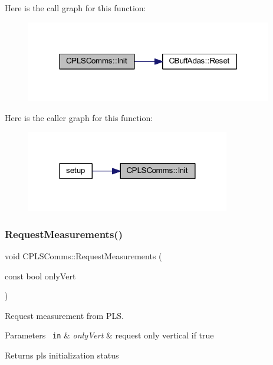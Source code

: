 Here is the call graph for this function\+:
\nopagebreak
\begin{figure}[H]
\begin{center}
\leavevmode
\includegraphics[width=305pt]{class_c_p_l_s_comms_ae7f8d87ea15de35a120d65a7a8bbbb76_cgraph}
\end{center}
\end{figure}
Here is the caller graph for this function\+:
\nopagebreak
\begin{figure}[H]
\begin{center}
\leavevmode
\includegraphics[width=252pt]{class_c_p_l_s_comms_ae7f8d87ea15de35a120d65a7a8bbbb76_icgraph}
\end{center}
\end{figure}
\mbox{\label{class_c_p_l_s_comms_ab69a49f5c4cd7b4b9f63fa16c7792920}} 
\subsubsection{\texorpdfstring{RequestMeasurements()}{RequestMeasurements()}}
{\footnotesize\ttfamily void C\+P\+L\+S\+Comms\+::\+Request\+Measurements (\begin{DoxyParamCaption}\item[{const bool}]{only\+Vert }\end{DoxyParamCaption})}



Request measurement from P\+LS. 


\begin{DoxyParams}[1]{Parameters}
\mbox{\texttt{ in}}  & {\em only\+Vert} & request only vertical if true \\
\hline
\end{DoxyParams}
\begin{DoxyReturn}{Returns}
pls initialization status 
\end{DoxyReturn}


